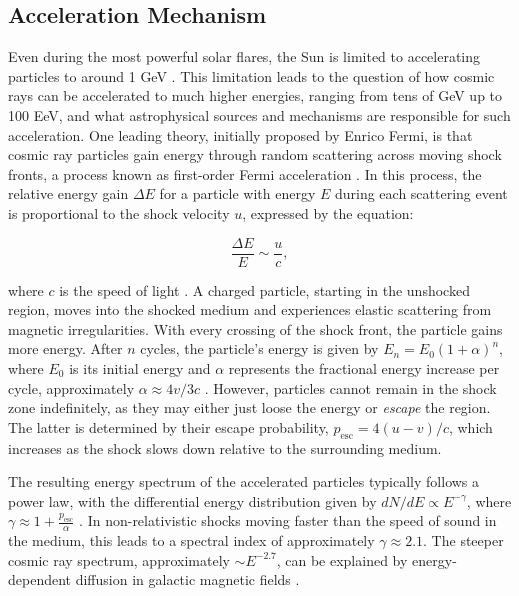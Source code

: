 \subsection{Acceleration Mechanism}
\label{sec:accln}
Even during the most powerful solar flares, the Sun is limited to accelerating particles to around 1 GeV . This limitation leads to the question of how cosmic rays can be accelerated to much higher energies, ranging from tens of GeV up to 100 EeV, and what astrophysical sources and mechanisms are responsible for such acceleration. One leading theory, initially proposed by Enrico Fermi, is that cosmic ray particles gain energy through random scattering across moving shock fronts, a process known as first-order Fermi acceleration . In this process, the relative energy gain $\Delta E$ for a particle with energy $E$ during each scattering event is proportional to the shock velocity $u$, expressed by the equation:

\begin{equation}
    \frac{\Delta E}{E} \sim \frac{u}{c},
\end{equation}

where $c$ is the speed of light .  A charged particle, starting in the unshocked region, moves into the shocked medium and experiences elastic scattering from magnetic irregularities. With every crossing of the shock front, the particle gains more energy. After $n$ cycles, the particle's energy is given by $E_n = E_0(1 + \alpha)^n$, where $E_0$ is its initial energy and $\alpha$ represents the fractional energy increase per cycle, approximately $\alpha \approx 4v/3c$ . However, particles cannot remain in the shock zone indefinitely, as they may either just loose the energy or \emph{escape} the region. The latter is determined by their escape probability, $p_{\text{esc}} = 4(u - v)/c$, which increases as the shock slows down relative to the surrounding medium.

The resulting energy spectrum of the accelerated particles typically follows a power law, with the differential energy distribution given by $dN/dE \propto E^{-\gamma}$, where $\gamma \approx 1 + \frac{p_{\text{esc}}}{\alpha}$ . In non-relativistic shocks moving faster than the speed of sound in the medium, this leads to a spectral index of approximately $\gamma \approx 2.1$. The steeper cosmic ray spectrum, approximately $\sim E^{-2.7}$, can be explained by energy-dependent diffusion in galactic magnetic fields .

